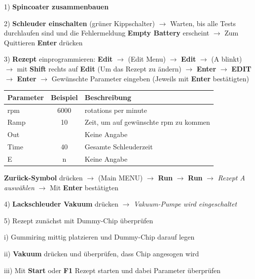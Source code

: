 \documentclass[
  ngerman,
  twoside,
  captions=tableheading,
  BCOR=.5cm,
  fontsize=11,
  ]{scrreprt}
\begin{document}
\begin{description}
\item 1) \textbf{Spincoater zusammenbauen}

\item 2) \textbf{Schleuder einschalten} (grüner Kippschalter)\newline
$\rightarrow$ Warten, bis alle Tests durchlaufen sind und die Fehlermeldung \textbf{Empty Battery} erscheint\newline
$\rightarrow$ Zum Quittieren \textbf{Enter} drücken

\item 3) \textbf{Rezept} einprogrammieren:\newline
\textbf{Edit} $\rightarrow$ (Edit Menu) $\rightarrow$ \textbf{Edit} $\rightarrow$ (A blinkt) $\rightarrow$ mit \textbf{Shift} rechts auf \textbf{Edit} (Um das Rezept zu ändern) $\rightarrow$ \textbf{Enter} $\rightarrow$ \textbf{EDIT} $\rightarrow$ \textbf{Enter} $\rightarrow$ Gewünschte Parameter eingeben (Jeweils mit \textbf{Enter} bestätigten)\\
\begin{center}
\begin{tabular}{|l | c | l|}\hline
\textbf{Parameter} & \textbf{Beispiel} & \textbf{Beschreibung}\\ \hline
rpm & 6000 & rotations per minute\\
Ramp & 10 & Zeit, um auf gewünschte rpm zu kommen\\
Out & & Keine Angabe\\
Time & 40 & Gesamte Schleuderzeit\\
E & n & Keine Angabe\\ \hline
\end{tabular}
\end{center}

\textbf{Zurück-Symbol} drücken $\rightarrow$ (Main MENU) $\rightarrow$ \textbf{Run} $\rightarrow$ \textbf{Run} $\rightarrow$ \textit{Rezept A auswählen} $\rightarrow$ Mit \textbf{Enter} bestätigten

\item 4) \textbf{Lackschleuder Vakuum} drücken $\rightarrow$ \textit{Vakuum-Pumpe wird eingeschaltet}

\item 5) Rezept zunächst mit Dummy-Chip überprüfen
\begin{description}
\item i) Gummiring mittig platzieren und Dummy-Chip darauf legen 
\item ii) \textbf{Vakuum} drücken und überprüfen, dass Chip angesogen wird
\item iii) Mit \textbf{Start} oder \textbf{F1} Rezept starten und dabei Parameter überprüfen


\end{description}
\end{description}
\end{document}
